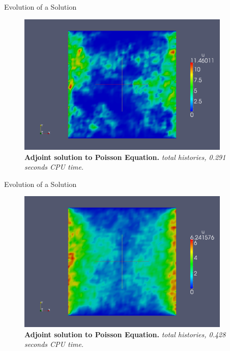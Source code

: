 \documentclass{beamer}
\begin{document}
\begin{frame}{Evolution of a Solution}

  \begin{figure}[h!]
    \begin{center}
      \includegraphics[width=4in]{adjoint_1000.png}
    \end{center}
    \caption{\textbf{Adjoint solution to Poisson Equation.}
      \textit{ total histories, 0.291 seconds CPU time.} }
  \end{figure}

\end{frame}

\begin{frame}{Evolution of a Solution}

  \begin{figure}[h!]
    \begin{center}
      \includegraphics[width=4in]{adjoint_10000.png}
    \end{center}
    \caption{\textbf{Adjoint solution to Poisson Equation.}
      \textit{ total histories, 0.428 seconds CPU time.} }
  \end{figure}

\end{frame}
\end{document}
